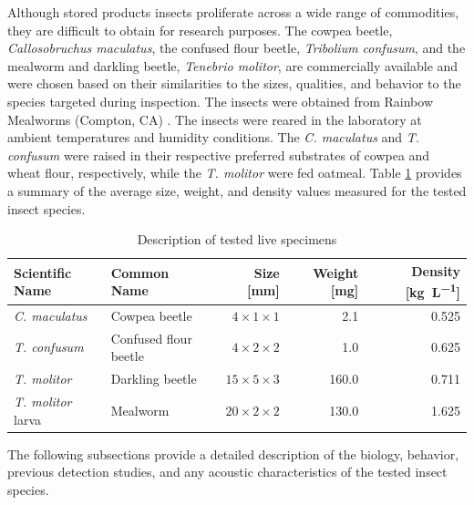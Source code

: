 \documentclass[../Vibro-Acoustic Signatures and Detection Algorithms for Stored Product Insects.tex]{subfiles}
\begin{document}
Although stored products insects proliferate across a wide range of commodities, they are difficult to obtain for research purposes. The cowpea beetle, \textit{Callosobruchus maculatus}, the confused flour beetle, \textit{Tribolium confusum}, and the mealworm and darkling beetle, \textit{Tenebrio molitor}, are commercially available and were chosen based on their similarities to the sizes, qualities, and behavior to the species targeted during inspection. The insects were obtained from Rainbow Mealworms (Compton, CA) \cite{RainbowMealwormsCrickets}. The insects were reared in the laboratory at ambient temperatures and humidity conditions. The \textit{C. maculatus} and \textit{T. confusum} were raised in their respective preferred substrates of cowpea and wheat flour, respectively, while the \textit{T. molitor} were fed oatmeal. Table \ref{tab:insects} provides a summary of the average size, weight, and density values measured for the tested insect species.

\begin{table}[!htbp]
	\caption{Description of tested live specimens \label{tab:insects}}
	\centering
	\small
	\begin{tabular}{@{}llrrr@{}}
		\toprule
		\textbf{Scientific Name}  & \textbf{Common Name}  & \textbf{Size [\si{\milli\meter}]} & \textbf{Weight [\si{\milli\gram}]} & \textbf{Density [\si{\kilo\gram\per\liter}]} \\
		\midrule
		\textit{C. maculatus}     & Cowpea beetle         & \(4 \times 1 \times 1\)           & 2.1                                & 0.525                                        \\
		\textit{T. confusum}      & Confused flour beetle & \(4 \times 2 \times 2\)           & 1.0                                & 0.625                                        \\
		\textit{T. molitor}       & Darkling beetle       & \(15 \times 5 \times 3\)          & 160.0                              & 0.711                                        \\
		\textit{T. molitor} larva & Mealworm              & \(20 \times 2 \times 2\)          & 130.0                              & 1.625                                        \\
		\bottomrule
	\end{tabular}
\end{table}

The following subsections provide a detailed description of the biology, behavior, previous detection studies, and any acoustic characteristics of the tested insect species.
\end{document}
